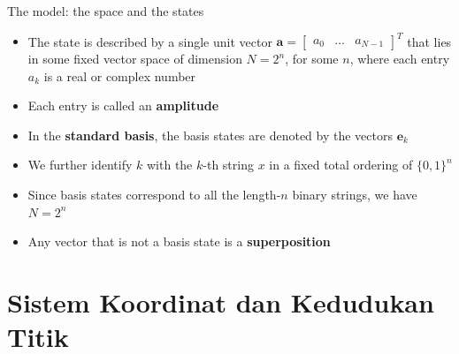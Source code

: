 \documentclass[aspectratio=169,11pt]{beamer}
\newcommand{\source}[1]{%
    \vfill
    \hfill{\tiny\color{gray}Sumber: #1}
}
\begin{document}
\begin{frame}{The model: the space and the states}
    \begin{itemize}
		\item The state is described by a single unit vector $\mathbf{a} = \begin{bmatrix} a_0 & \dots & a_{N-1}\end{bmatrix}^T$ that lies in some fixed vector space of dimension $N = 2^n$, for some $n$, where each entry $a_k$ is a real or complex number
		\item Each entry is called an \textbf{amplitude}
		\item In the \textbf{standard basis}, the basis states are denoted by the vectors $\mathbf{e}_k$
		\item We further identify $k$ with the $k$-th string $x$ in a fixed total ordering of $\{0,1\}^n$
		\item Since basis states correspond to all the length-$n$ binary strings, we have $N = 2^n$
		\item Any vector that is not a basis state is a \textbf{superposition}
	\end{itemize}
\end{frame}


\section{Sistem Koordinat dan Kedudukan Titik}
\end{document}
